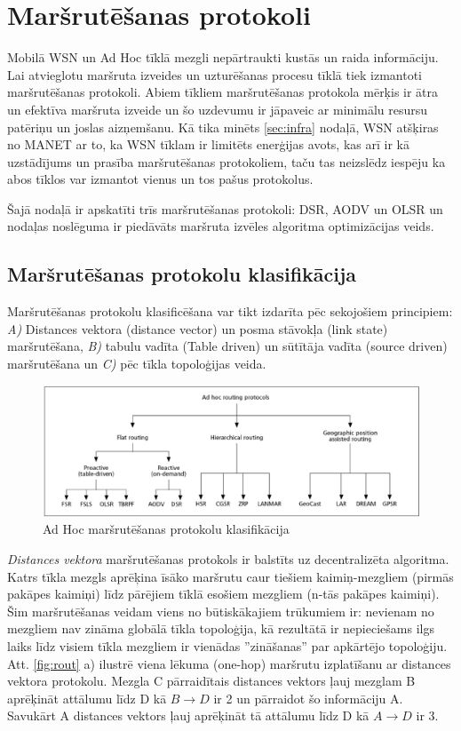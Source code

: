 \chapter{Maršrutēšanas protokoli}\label{sec:prot}
Mobilā WSN un Ad Hoc tīklā mezgli nepārtraukti kustās un raida informāciju. Lai atvieglotu maršruta izveides un uzturēšanas procesu tīklā tiek izmantoti maršrutēšanas protokoli. Abiem tīkliem maršrutēšanas protokola mērķis ir ātra un efektīva maršruta izveide un šo uzdevumu ir jāpaveic ar minimālu resursu patēriņu un joslas aizņemšanu. Kā tika minēts \ref{sec:infra} nodaļā, WSN atšķiras no MANET ar to, ka WSN tīklam ir limitēts enerģijas avots, kas arī ir kā uzstādījums un prasība maršrutēšanas protokoliem, taču tas neizslēdz iespēju ka abos tīklos var izmantot vienus un tos pašus protokolus.

Šajā nodaļā ir apskatīti trīs maršrutēšanas protokoli: DSR, AODV un OLSR un nodaļas noslēguma ir piedāvāts maršruta izvēles algoritma optimizācijas veids.

\section{Maršrutēšanas protokolu klasifikācija}
Maršrutēšanas protokolu klasificēšana var tikt izdarīta pēc sekojošiem principiem: \emph{A)} Distances vektora (distance vector) un posma stāvokļa (link state) maršrutēšana, \emph{B)} tabulu vadīta (Table driven) un sūtītāja vadīta (source driven) maršrutēšana un \emph{C)} pēc tīkla topoloģijas veida.

\begin{figure}[ht!]
\centering
\includegraphics[scale=0.4]{./graph/protocol}
 \caption{Ad Hoc maršrutēšanas protokolu klasifikācija \cite{hong}}
\end{figure}

\textit{Distances vektora}  maršrutēšanas protokols ir balstīts uz decentralizēta algoritma. Katrs tīkla mezgls aprēķina īsāko maršrutu caur tiešiem kaimiņ-mezgliem (pirmās pakāpes kaimiņi) līdz pārējiem tīklā esošiem mezgliem (n-tās pakāpes kaimiņi). Šim maršrutēšanas veidam viens no būtiskākajiem trūkumiem ir: nevienam no mezgliem nav zināma globālā tīkla topoloģija, kā rezultātā ir nepieciešams ilgs laiks līdz visiem tīkla mezgliem ir vienādas ''zināšanas'' par apkārtējo topoloģiju. Att. \ref{fig:rout} a) ilustrē viena lēkuma (one-hop) maršrutu izplatīšanu ar distances vektora protokolu. Mezgla C pārraidītais distances vektors ļauj mezglam B aprēķināt attālumu līdz D kā $B \rightarrow D$ ir 2 un pārraidot šo informāciju A. Savukārt A distances vektors ļauj aprēķināt tā attālumu līdz D kā $A \rightarrow D$ ir 3.

